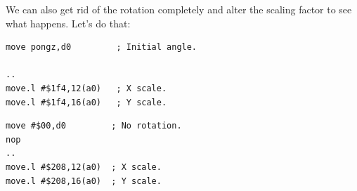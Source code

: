 We can also get rid of the rotation completely and alter the scaling factor to see
what happens. Let's do that:

\begin{minipage}[c]{0.48\linewidth}
\begin{lstlisting}[basicstyle=\scriptsize\ttfamily]
move pongz,d0         ; Initial angle.

..
move.l #$1f4,12(a0)   ; X scale.
move.l #$1f4,16(a0)   ; Y scale.
\end{lstlisting}
\end{minipage}
\hspace{0.1cm}
\hspace{0.1cm}
\begin{minipage}[c]{0.48\linewidth}
\begin{lstlisting}[basicstyle=\scriptsize\ttfamily]
move #$00,d0         ; No rotation.
nop
..
move.l #$208,12(a0)  ; X scale.
move.l #$208,16(a0)  ; Y scale.
\end{lstlisting}
\vspace*{\fill}
\end{minipage}

